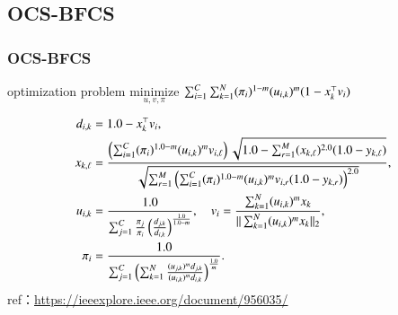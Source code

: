 \documentclass[fleqn,dvipdfmx,10pt]{beamer}
\begin{document}
\subsection{OCS-BFCS}
\begin{frame}\frametitle{OCS-BFCS}
  \begin{block}{optimization problem}
    $\underset{u,v,\pi}{\text{minimize}}$
    $\sum_{i=1}^C\sum_{k=1}^N(\pi_{i})^{1-m}(u_{i,k})^m(1-x_k^{\top}v_i)$ \centering\\
  \end{block}
  \begin{align*}
    d_{i,k}&=1.0-x_k^{\top}v_i,\\
    x_{k,\ell}&=\frac{\left(\sum_{i=1}^C(\pi_i)^{1.0-m}(u_{i,k})^mv_{i,\ell}\right)\sqrt{1.0-\sum_{r=1}^M(x_{k,\ell})^{2.0}(1.0-y_{k,\ell})}}{\sqrt{\sum_{r=1}^M\left(\sum_{i=1}^C(\pi_i)^{1.0-m}(u_{i,k})^mv_{i,r}(1.0-y_{k,r})\right)^{2.0}}},\\
    u_{i,k}&=\frac{1.0}{\sum_{j=1}^C\frac{\pi_{j}}{\pi_{i}}\left(\frac{d_{j,k}}{d_{i,k}}\right)^\frac{1.0}{1.0-m}},\quad
    v_{i}=\frac{\sum_{k=1}^N (u_{i,k})^m x_{k}}{||\sum_{k=1}^N (u_{i,k})^mx_{k}||_2},\\
    \pi_{i}&=\frac{1.0}{\sum_{j=1}^C\left(\sum_{k=1}^N\frac{(u_{j,k})^md_{j,k}}{(u_{i,k})^md_{i,k}}\right)^{\frac{1.0}{m}}}.
  \end{align*}
  ref：\url{https://ieeexplore.ieee.org/document/956035/}\centering
\end{frame}
\end{document}
